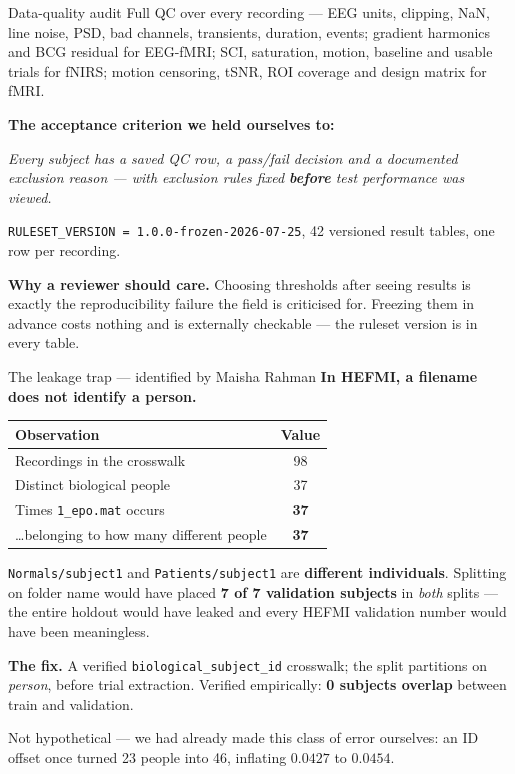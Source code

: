 \documentclass[aspectratio=169,11pt]{beamer}
\begin{document}
\begin{frame}{Data-quality audit}
Full QC over every recording --- EEG units, clipping, NaN, line noise, PSD, bad
channels, transients, duration, events; gradient harmonics and BCG residual for
EEG-fMRI; SCI, saturation, motion, baseline and usable trials for fNIRS; motion
censoring, tSNR, ROI coverage and design matrix for fMRI.

\vspace{0.5em}
\textbf{The acceptance criterion we held ourselves to:}
\begin{center}
\emph{Every subject has a saved QC row, a pass/fail decision and a documented
exclusion reason --- with exclusion rules fixed \textbf{before} test performance
was viewed.}
\end{center}

\vspace{0.5em}
\texttt{RULESET\_VERSION = 1.0.0-frozen-2026-07-25}, 42 versioned result tables,
one row per recording.

\vspace{0.5em}
\textbf{Why a reviewer should care.} Choosing thresholds after seeing results is
exactly the reproducibility failure the field is criticised for. Freezing them in
advance costs nothing and is externally checkable --- the ruleset version is in
every table.
\end{frame}

\begin{frame}{The leakage trap --- identified by Maisha Rahman}
\textbf{In HEFMI, a filename does not identify a person.}

\begin{center}\small
\begin{tabular}{lc}
\toprule
Observation & Value \\
\midrule
Recordings in the crosswalk & 98 \\
Distinct biological people & 37 \\
Times \texttt{1\_epo.mat} occurs & \textbf{37} \\
\dots belonging to how many different people & \textbf{37} \\
\bottomrule
\end{tabular}
\end{center}

\vspace{0.5em}
\texttt{Normals/subject1} and \texttt{Patients/subject1} are \textbf{different
individuals}. Splitting on folder name would have placed
\textcolor{bad}{\textbf{7 of 7 validation subjects}} in \emph{both} splits --- the
entire holdout would have leaked and every HEFMI validation number would have
been meaningless.

\vspace{0.5em}
\textbf{The fix.} A verified \texttt{biological\_subject\_id} crosswalk; the split
partitions on \emph{person}, before trial extraction. Verified empirically:
\textbf{0 subjects overlap} between train and validation.

\vspace{0.4em}
\textcolor{warn}{Not hypothetical --- we had already made this class of error
ourselves: an ID offset once turned 23 people into 46, inflating $0.0427$ to
$0.0454$.}
\end{frame}
\end{document}
